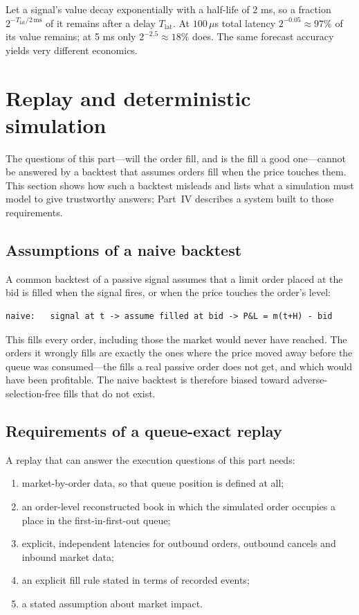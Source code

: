 \begin{example}
Let a signal's value decay exponentially with a half-life of 2 ms, so a fraction
$2^{-T_{\text{lat}}/2\,\mathrm{ms}}$ of it remains after a delay $T_{\text{lat}}$. At $100\,\mu$s total latency
$2^{-0.05} \approx 97\%$ of its value remains; at 5 ms only $2^{-2.5} \approx 18\%$ does. The same
forecast accuracy yields very different economics.
\end{example}

\section{Replay and deterministic simulation}
\label{sec:replay}

The questions of this part---will the order fill, and is the fill a good one---cannot be answered by
a backtest that assumes orders fill when the price touches them. This section shows how such a
backtest misleads and lists what a simulation must model to give trustworthy answers; Part~IV
describes a system built to those requirements.

\subsection{Assumptions of a naive backtest}

A common backtest of a passive signal assumes that a limit order placed at the bid is filled when
the signal fires, or when the price touches the order's level:
\begin{lstlisting}
naive:   signal at t -> assume filled at bid -> P&L = m(t+H) - bid
\end{lstlisting}
This fills every order, including those the market would never have reached. The orders it wrongly
fills are exactly the ones where the price moved away before the queue was consumed---the fills a
real passive order does not get, and which would have been profitable. The naive backtest is
therefore biased toward adverse-selection-free fills that do not exist.

\subsection{Requirements of a queue-exact replay}

A replay that can answer the execution questions of this part needs:
\begin{enumerate}[leftmargin=1.5em]
\item market-by-order data, so that queue position is defined at all;
\item an order-level reconstructed book in which the simulated order occupies a place in the
  first-in-first-out queue;
\item explicit, independent latencies for outbound orders, outbound cancels and inbound market
  data;
\item an explicit fill rule stated in terms of recorded events;
\item a stated assumption about market impact.
\end{enumerate}

